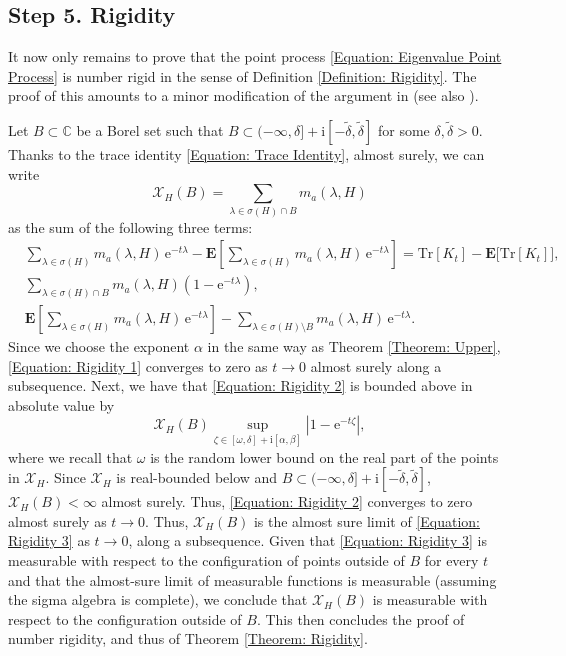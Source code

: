 \documentclass{amsart}
\numberwithin{equation}{section}
\theoremstyle{definition}
\newcommand\al{\alpha}
\newcommand\be{\beta}
\newcommand\de{\delta}
\newcommand\la{\lambda}
\newcommand\om{\omega}
\newcommand\si{\sigma}
\newcommand\ze{\zeta}
\newcommand\mbb{\mathbb}
\newcommand\mbf{\mathbf}
\newcommand\mc{\mathcal}
\newcommand\mr{\mathrm}
\begin{document}
%

\subsection{Step 5. Rigidity}

It now only remains to prove that the point process
\eqref{Equation: Eigenvalue Point Process}
is number rigid in the sense of Definition \ref{Definition: Rigidity}. The proof of
this amounts to a minor modification of the argument in \cite[Theorem 6.1]{GP17} (see also
\cite[Proposition 2.2]{GGL20}).

%

Let $B\subset\mbb C$ be a Borel set such that
$B\subset(-\infty,\de]+\mr i[-\tilde \de,\tilde \de]$
for some $\de,\tilde\de>0$.
Thanks to the trace identity \eqref{Equation: Trace Identity},
almost surely,
we can write 
\[\mc X_H(B)=\sum_{\la\in\si(H)\cap B}m_a(\la,H)\]
as the sum of the following three terms:
\begin{align}
\label{Equation: Rigidity 1}
&\sum_{\la\in\si(H)}m_a(\la,H)\,\mr e^{-t\la}-\mbf E\left[\sum_{\la\in\si(H)}m_a(\la,H)\,\mr e^{-t\la}\right]=\mr{Tr}[K_t]-\mbf E\big[\mr{Tr}[K_t]\big],\\
\label{Equation: Rigidity 2}
&\sum_{\la\in\si(H)\cap B}m_a(\la,H)\left(1-\mr e^{-t\la}\right),\\
\label{Equation: Rigidity 3}
&\mbf E\left[\sum_{\la\in\si(H)}m_a(\la,H)\,\mr e^{-t\la}\right]
-\sum_{\la\in\si(H)\setminus B}m_a(\la,H)\,\mr e^{-t\la}.
\end{align}
Since we choose the exponent $\al$ in the same way as
Theorem \ref{Theorem: Upper}, \eqref{Equation: Rigidity 1} converges to zero as $t\to0$
almost surely along a subsequence.
Next, we have that \eqref{Equation: Rigidity 2} is bounded above
in absolute value by
\[\mc X_H(B)\sup_{\ze\in[\om,\de]+\mr i[\al,\be]}|1-\mr e^{-t\ze}|,\]
where we recall that $\om$ is the random lower bound on the real part
of the points in $\mc X_H$.
Since $\mc X_H$ is real-bounded below and $B\subset(-\infty,\de]+\mr i[-\tilde \de,\tilde \de]$,
$\mc X_H(B)<\infty$ almost surely. Thus, \eqref{Equation: Rigidity 2}
converges to zero almost surely as $t\to0$.
Thus, $\mc X_H(B)$ is the almost sure limit of \eqref{Equation: Rigidity 3}
as $t\to0$, along a subsequence.
Given that \eqref{Equation: Rigidity 3}
is measurable with respect
to the configuration of points outside of $B$ for every $t$ and that the almost-sure limit of measurable functions is measurable (assuming the sigma algebra is complete),
we conclude that $\mc X_H(B)$ is measurable with respect
to the configuration outside of $B$. This then concludes the proof
of number rigidity, and thus of Theorem \ref{Theorem: Rigidity}.
\end{document}
